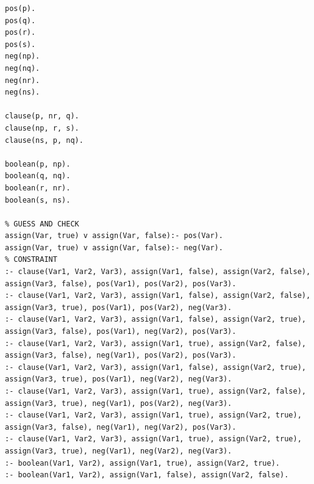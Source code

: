 \documentclass[12pt,fullpage]{article}
\begin{document}
\begin{verbatim}
pos(p).
pos(q).
pos(r).
pos(s).
neg(np).
neg(nq).
neg(nr).
neg(ns).

clause(p, nr, q).
clause(np, r, s).
clause(ns, p, nq).

boolean(p, np).
boolean(q, nq).
boolean(r, nr).
boolean(s, ns).

% GUESS AND CHECK
assign(Var, true) v assign(Var, false):- pos(Var).
assign(Var, true) v assign(Var, false):- neg(Var).
% CONSTRAINT
:- clause(Var1, Var2, Var3), assign(Var1, false), assign(Var2, false),
assign(Var3, false), pos(Var1), pos(Var2), pos(Var3).
:- clause(Var1, Var2, Var3), assign(Var1, false), assign(Var2, false),
assign(Var3, true), pos(Var1), pos(Var2), neg(Var3).
:- clause(Var1, Var2, Var3), assign(Var1, false), assign(Var2, true),
assign(Var3, false), pos(Var1), neg(Var2), pos(Var3).
:- clause(Var1, Var2, Var3), assign(Var1, true), assign(Var2, false),
assign(Var3, false), neg(Var1), pos(Var2), pos(Var3).
:- clause(Var1, Var2, Var3), assign(Var1, false), assign(Var2, true),
assign(Var3, true), pos(Var1), neg(Var2), neg(Var3).
:- clause(Var1, Var2, Var3), assign(Var1, true), assign(Var2, false),
assign(Var3, true), neg(Var1), pos(Var2), neg(Var3).
:- clause(Var1, Var2, Var3), assign(Var1, true), assign(Var2, true),
assign(Var3, false), neg(Var1), neg(Var2), pos(Var3).
:- clause(Var1, Var2, Var3), assign(Var1, true), assign(Var2, true),
assign(Var3, true), neg(Var1), neg(Var2), neg(Var3).
:- boolean(Var1, Var2), assign(Var1, true), assign(Var2, true).
:- boolean(Var1, Var2), assign(Var1, false), assign(Var2, false).
\end{verbatim}
\end{document}
